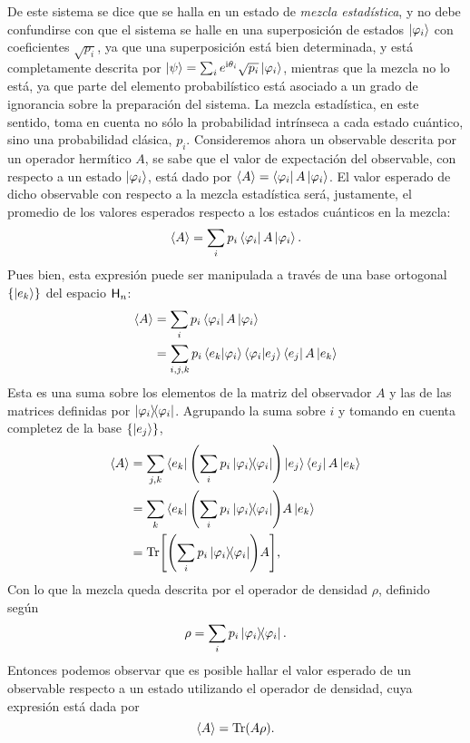 De este sistema se dice que se halla en un estado de \textit{mezcla estadística}, y no debe confundirse con que el sistema se halle en una superposición de estados $\ket{\varphi_{i}}$ con coeficientes $\sqrt{p_{i}}$, ya que una superposición está bien determinada, y está completamente descrita por $\ket{\psi}=\sum_{i} e^{\text{i} \theta_i} \sqrt{p_{i}}\ket{\varphi_{i}}$, mientras que la mezcla no lo está, ya que parte del elemento probabilístico está asociado a un grado de ignorancia sobre la preparación del sistema. La mezcla estadística, en este sentido, toma en cuenta no sólo la probabilidad intrínseca a cada estado cuántico, sino una probabilidad clásica, $p_{i}$. Consideremos ahora un observable descrita por un operador hermítico $A$, se sabe que el valor de expectación del observable, con respecto a un estado $\ket{\varphi_{i}}$, está dado por $\expval{A}=\bra{\varphi_{i}}A\ket{\varphi_{i}}$. El valor esperado de dicho observable con respecto a la mezcla estadística será, justamente, el promedio de los valores esperados respecto a los estados cuánticos en la mezcla:
\begin{equation}
\expval{A}=\sum_{i}p_{i}\bra{\varphi_{i}}A\ket{\varphi_{i}}. \nonumber
\end{equation}
Pues bien, esta expresión puede ser manipulada a través de una base ortogonal $\{\ket{e_{k}}\}$ del espacio ${\sf H}_{n}$:
\begin{align}
\expval{A}&=\sum_{i}p_{i}\bra{\varphi_{i}}A\ket{\varphi_{i}}\nonumber\\ 
&=\sum_{i,j,k}p_{i}\bra{e_{k}}\ket{\varphi_{i}}\bra{\varphi_{i}}\ket{e_{j}} \bra{e_{j}}A\ket{e_{k}} \nonumber
\end{align}
Esta es una suma sobre los elementos de la matriz del observador $A$ y las de las matrices definidas por $\dyad{\varphi_{i}}$. Agrupando la suma sobre $i$ y tomando en cuenta completez de la base $\{\ket{e_{j}}\}$,
\begin{align}
\expval{A}&=\sum_{j,k}\bra{e_{k}}\qty(\sum_{i}p_{i}\dyad{\varphi_{i}})\ket{e_{j}} \bra{e_{j}}A\ket{e_{k}}\nonumber\\
&=\sum_{k}\bra{e_{k}}\qty(\sum_{i}p_{i}\dyad{\varphi_{i}})A\ket{e_{k}}\nonumber\\
&=\Tr[\qty(\sum_{i}p_{i}\dyad{\varphi_{i}})A]\rlap{,}\nonumber
\end{align}
Con lo que la mezcla queda descrita por el operador de densidad $\rho$, definido según
\begin{equation}\label{eq:DensOpMix}
\rho=\sum_{i}p_{i}\dyad{\varphi_{i}}.
\end{equation}
Entonces podemos observar que es posible hallar el valor esperado de un observable respecto a un estado  utilizando el operador de densidad, cuya expresión está dada por
\begin{equation}\label{eq:ExpValFromDensOp}
\expval{A}=\Tr(A\rho).
\end{equation}


